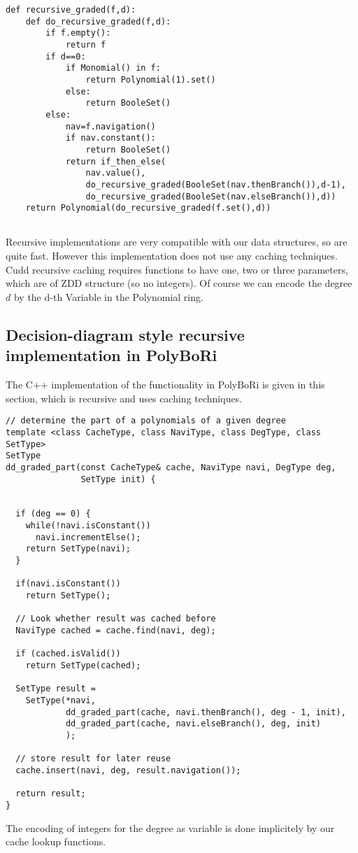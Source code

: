 \documentclass[]{article}
\newcommand{\PolyBoRi}{{\sc PolyBoRi}\xspace}
\begin{document}
\begin{verbatim}
def recursive_graded(f,d):
    def do_recursive_graded(f,d):
        if f.empty():
            return f
        if d==0:
            if Monomial() in f:
                return Polynomial(1).set()
            else:
                return BooleSet()
        else:
            nav=f.navigation()
            if nav.constant():
                return BooleSet()
            return if_then_else(
                nav.value(),
                do_recursive_graded(BooleSet(nav.thenBranch()),d-1),
                do_recursive_graded(BooleSet(nav.elseBranch()),d))
    return Polynomial(do_recursive_graded(f.set(),d))
        
\end{verbatim}
Recursive implementations are very compatible with our data structures, so are quite fast. However this implementation does not use any caching techniques. Cudd recursive caching requires functions to have one, two or three parameters, which are of ZDD structure (so no integers).
Of course we can encode the degree $d$ by the d-th Variable in the Polynomial
ring.

\subsection{Decision-diagram style recursive implementation in \PolyBoRi}
The C++ implementation of the functionality in \PolyBoRi is given in this section, which is recursive and uses caching techniques.
\begin{verbatim}
// determine the part of a polynomials of a given degree
template <class CacheType, class NaviType, class DegType, class SetType>
SetType
dd_graded_part(const CacheType& cache, NaviType navi, DegType deg,  
               SetType init) {


  if (deg == 0) {
    while(!navi.isConstant())
      navi.incrementElse();
    return SetType(navi);
  }

  if(navi.isConstant())
    return SetType();

  // Look whether result was cached before
  NaviType cached = cache.find(navi, deg);

  if (cached.isValid())
    return SetType(cached);

  SetType result = 
    SetType(*navi,  
            dd_graded_part(cache, navi.thenBranch(), deg - 1, init),
            dd_graded_part(cache, navi.elseBranch(), deg, init)
            );

  // store result for later reuse
  cache.insert(navi, deg, result.navigation());

  return result;
}
\end{verbatim}
The encoding of integers for the degree as variable is done implicitely by our cache lookup functions.
\end{document}
